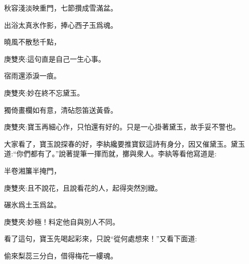 \begin{poem}
    \begin{pl}秋容淺淡映重門，七節攢成雪滿盆。\end{pl}

    \begin{pl}出浴太真氷作影，捧心西子玉爲魂。\end{pl}

    \begin{pl}曉風不散愁千點，\end{pl}
    \begin{note}庚雙夾:這句直是自己一生心事。\end{note}
    \begin{pl}宿雨還添淚一痕。\end{pl}
    \begin{note}庚雙夾:妙在終不忘黛玉。\end{note}

    \begin{pl}獨倚畫欄如有意，清砧怨笛送黃昏。\end{pl}
    \begin{note}庚雙夾:寶玉再細心作，只怕還有好的。只是一心掛著黛玉，故手妥不警也。\end{note}
\end{poem}


\begin{parag}
    大家看了，寶玉說探春的好，李紈纔要推寶釵這詩有身分，因又催黛玉。黛玉道:“你們都有了。”說著提筆一揮而就，擲與衆人。李紈等看他寫道是:
\end{parag}


\begin{poem}
    \begin{pl}半卷湘簾半掩門，\end{pl}\begin{note}庚雙夾:且不說花，且說看花的人，起得突然別緻。\end{note}

    \begin{pl}碾氷爲土玉爲盆。\end{pl}\begin{note}庚雙夾:妙極！料定他自與別人不同。\end{note}
\end{poem}


\begin{parag}
    看了這句，寶玉先喝起彩來，只說“從何處想來！”又看下面道:
\end{parag}


\begin{poem}
    \begin{pl}偷來梨蕊三分白，借得梅花一縷魂。\end{pl}
\end{poem}


